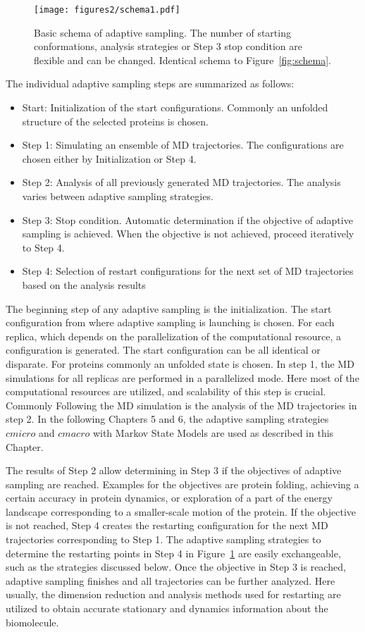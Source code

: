 \begin{figure}[h]
  \centering
  \texttt{[image: figures2/schema1.pdf]}
  \caption{Basic schema of adaptive sampling. The
  number of starting conformations, analysis strategies or Step 3 stop condition are flexible and can be changed. Identical schema to Figure~\ref{fig:schema}.}
  \label{fig:schema2}
\end{figure}

The individual adaptive sampling steps are summarized as follows:
\begin{itemize}
\item Start: Initialization of the start configurations.  Commonly an unfolded structure of the selected proteins is chosen.
\item Step 1: Simulating an ensemble of MD trajectories. The configurations are chosen either by Initialization or Step 4. 
\item Step 2: Analysis of all previously generated MD trajectories. The analysis varies between adaptive sampling strategies.
\item Step 3: Stop condition. Automatic determination if the objective of adaptive sampling is achieved. When the objective is not achieved, proceed iteratively to Step 4. 
\item Step 4: Selection of restart configurations for the next set of MD trajectories based on the analysis results 
\end{itemize}

The beginning step of any adaptive sampling is the initialization. The start configuration from where adaptive sampling is launching is chosen. For each replica, which depends on the parallelization of the computational resource, a configuration is generated. The start configuration can be all identical or disparate. For proteins commonly an unfolded state is chosen.
In step 1, the MD simulations for all replicas are performed in a parallelized mode. Here most of the computational resources are utilized, and scalability of this step is crucial. Commonly  
Following the MD simulation is the analysis of the MD trajectories in step 2. In the following Chapters 5 and 6, the adaptive sampling strategies $cmicro$ and $cmacro$ with Markov State Models \cite{prinz2011markov} are used as described in this Chapter. 

The results of Step 2 allow determining in Step 3 if the objectives of adaptive sampling are reached. Examples for the objectives are protein folding, achieving a certain accuracy in protein dynamics, or exploration of a part of the energy landscape corresponding to a smaller-scale motion of the protein. If the objective is not reached, Step 4 creates the restarting configuration for the next MD trajectories corresponding to Step 1. The adaptive sampling strategies to determine the restarting points in Step 4 in Figure~\ref{fig:schema2} are easily exchangeable, such as the strategies discussed below. Once the objective in Step 3 is reached, adaptive sampling finishes and all trajectories can be further analyzed. Here usually, the dimension reduction and analysis methods used for restarting are utilized to obtain accurate stationary and dynamics information about the biomolecule.


